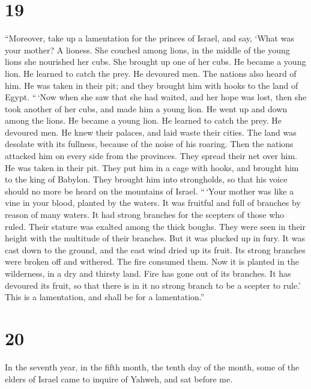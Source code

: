 \hypertarget{section-18}{%
\section{19}\label{section-18}}

 ``Moreover, take up a lamentation for the princes of
Israel,  and say, `What was your mother? A lioness. She
couched among lions, in the middle of the young lions she nourished her
cubs.  She brought up one of her cubs. He became a young
lion. He learned to catch the prey. He devoured men.  The
nations also heard of him. He was taken in their pit; and they brought
him with hooks to the land of Egypt.  ``\,`Now when she
saw that she had waited, and her hope was lost, then she took another of
her cubs, and made him a young lion.  He went up and down
among the lions. He became a young lion. He learned to catch the prey.
He devoured men.  He knew their palaces, and laid waste
their cities. The land was desolate with its fullness, because of the
noise of his roaring.  Then the nations attacked him on
every side from the provinces. They spread their net over him. He was
taken in their pit.  They put him in a cage with hooks,
and brought him to the king of Babylon. They brought him into
strongholds, so that his voice should no more be heard on the mountains
of Israel.  ``\,`Your mother was like a vine in your
blood, planted by the waters. It was fruitful and full of branches by
reason of many waters.  It had strong branches for the
scepters of those who ruled. Their stature was exalted among the thick
boughs. They were seen in their height with the multitude of their
branches.  But it was plucked up in fury. It was cast
down to the ground, and the east wind dried up its fruit. Its strong
branches were broken off and withered. The fire consumed them.
 Now it is planted in the wilderness, in a dry and
thirsty land.  Fire has gone out of its branches. It has
devoured its fruit, so that there is in it no strong branch to be a
scepter to rule.' This is a lamentation, and shall be for a
lamentation.''

\hypertarget{section-19}{%
\section{20}\label{section-19}}

 In the seventh year, in the fifth month, the tenth day of
the month, some of the elders of Israel came to inquire of Yahweh, and
sat before me.

